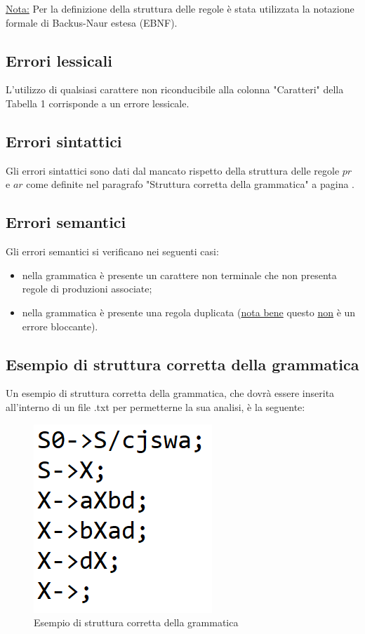 \documentclass[12pt]{article}
\begin{document}
\underline{Nota:} Per la definizione della struttura delle regole è stata utilizzata la notazione formale di Backus-Naur estesa (EBNF).

\subsection{Errori lessicali}
L'utilizzo di qualsiasi carattere non riconducibile alla colonna "Caratteri" della Tabella 1 corrisponde a un errore lessicale.

\subsection{Errori sintattici}
Gli errori sintattici sono dati dal mancato rispetto della struttura delle regole $pr$ e $ar$ come definite nel paragrafo "Struttura corretta della grammatica" a pagina \pageref{struttura}.

\subsection{Errori semantici}
Gli errori semantici si verificano nei seguenti casi:
\begin{itemize}
\item nella grammatica è presente un carattere non terminale che non presenta regole di produzioni associate;
\item nella grammatica è presente una regola duplicata (\underline{nota bene} questo \underline{non} è un errore bloccante).
\end{itemize}

\subsection{Esempio di struttura corretta della grammatica}
Un esempio di struttura corretta della grammatica, che dovrà essere inserita all'interno di un file .txt per permetterne la sua analisi, è la seguente:
\begin{figure}[h!]
\centering
\includegraphics[scale=1.0]{immagini/esempioGrammatica.png}
\caption{Esempio di struttura corretta della grammatica}
\end{figure}
\end{document}
